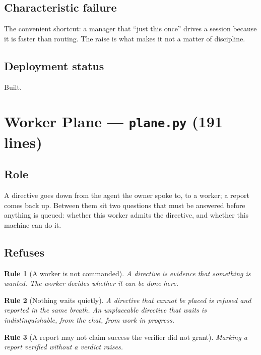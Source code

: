 \documentclass[11pt]{article}
\newtheorem{drule}{Rule}
\newcommand{\code}[1]{\texttt{\small #1}}
\begin{document}
\subsection{Characteristic failure}

The convenient shortcut: a manager that ``just this once'' drives a session because it is faster than routing. The raise is what makes it not a matter of discipline.

\subsection{Deployment status}

Built.

\section{Worker Plane --- \code{plane.py} (191 lines)}
\label{sec:plane}

\subsection{Role}

A directive goes down from the agent the owner spoke to, to a worker; a report comes back up. Between them sit two questions that must be answered before anything is queued: whether this worker admits the directive, and whether this machine can do it.

\subsection{Refuses}

\begin{drule}[A worker is not commanded]
\label{rule:notcommanded}
A directive is evidence that something is wanted. The worker decides whether it can be done \emph{here}.
\end{drule}

\begin{drule}[Nothing waits quietly]
\label{rule:noqueue}
A directive that cannot be placed is refused and reported in the same breath. An unplaceable directive that waits is indistinguishable, from the chat, from work in progress.
\end{drule}

\begin{drule}[A report may not claim success the verifier did not grant]
\label{rule:noselfgrade}
Marking a report verified without a verdict raises.
\end{drule}
\end{document}
